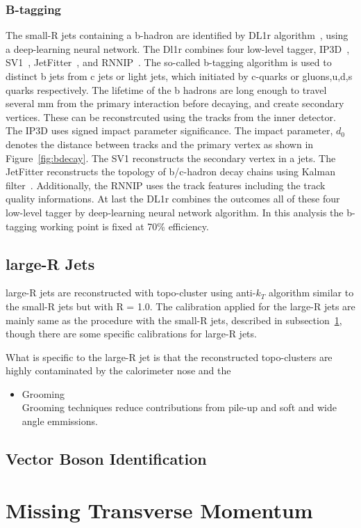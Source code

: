 \subsubsection{B-tagging}
The small-R jets containing a b-hadron are identified by DL1r algorithm~\cite{ATL-PHYS-PUB-2020-009}, using a deep-learning neural network.
The Dl1r combines four low-level tagger, IP3D~\cite{ATL-PHYS-PUB-2017-013}, SV1~\cite{ATL-PHYS-PUB-2017-011}, JetFitter~\cite{ATL-PHYS-PUB-2018-025}, and RNNIP~\cite{ATL-PHYS-PUB-2017-003}.
The so-called b-tagging algorithm is used to distinct b jets from c jets or light jets, which initiated by c-quarks or gluons,u,d,s quarks respectively.
The lifetime of the b hadrons are long enough to travel several mm from the primary interaction before decaying, and create secondary vertices. These can be reconstrcuted using the tracks from the inner detector.
The IP3D uses signed impact parameter significance. The impact parameter, $d_0$ denotes the distance between tracks and the primary vertex as shown in Figure~\ref{fig:bdecay}.
The SV1 reconstructs the secondary vertex in a jets. The JetFitter reconstructs the topology of b/c-hadron decay chains using Kalman filter~\cite{FRUHWIRTH1987444}.
Additionally, the RNNIP uses the track features including the track quality informations.
At last the DL1r combines the outcomes all of these four low-level tagger by deep-learning neural network algorithm.
In this analysis the b-tagging working point is fixed at 70\% efficiency.

\subsection{large-R Jets}
large-R jets are reconstructed with topo-cluster using anti-$k_T$ algorithm similar to the small-R jets but with R = 1.0. The calibration applied for the large-R jets are mainly same as the procedure with the small-R jets, described in subsection~\ref{}, though there are some specific calibrations for large-R jets.

What is specific to the large-R jet is that the reconstructed topo-clusters are highly contaminated by the calorimeter nose and the 
\begin{itemize}
    \item Grooming \\
    Grooming techniques reduce contributions from pile-up and soft and wide angle emmissions.
\end{itemize}

\subsection{Vector Boson Identification}



\section{Missing Transverse Momentum}


